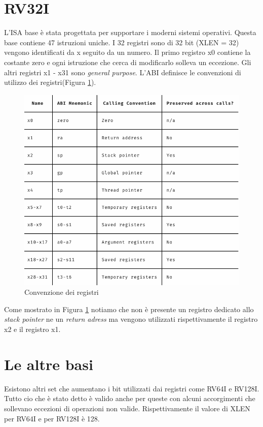 \documentclass[12pt,a4paper]{report}
\begin{document}
\section{RV32I}
L'ISA base è stata progettata per supportare i moderni sistemi operativi. Questa base contiene 47 istruzioni uniche.  I 32 registri sono di 32 bit (XLEN = 32) vengono identificati da x seguito da un numero. Il primo registro x0 contiene la costante zero e ogni istruzione che cerca di modificarlo solleva un eccezione. Gli altri registri x1 - x31 sono \textit{general purpose}.  L'ABI definisce le convenzioni di utilizzo dei registri(Figura \ref{Fig:ConvenzioneRegistri}).

\begin{figure}[h!]
\centering
	\includegraphics[scale=0.3]{ABI-RISC-V}
	\caption{Convenzione dei registri}
	\label{Fig:ConvenzioneRegistri}
\end{figure}

Come mostrato in Figura \ref{Fig:ConvenzioneRegistri} notiamo che non è presente un registro dedicato allo \textit{stack pointer} ne un \textit{return adress} ma vengono utilizzati rispettivamente il registro x2 e il registro x1.


\section{Le altre basi}
Esistono altri set che aumentano i bit utilizzati dai registri come RV64I e RV128I. Tutto cio che è stato detto è valido anche per queste con alcuni accorgimenti che sollevano eccezioni di operazioni non valide.
Rispettivamente il valore di XLEN per RV64I e per RV128I è 128.
\end{document}
